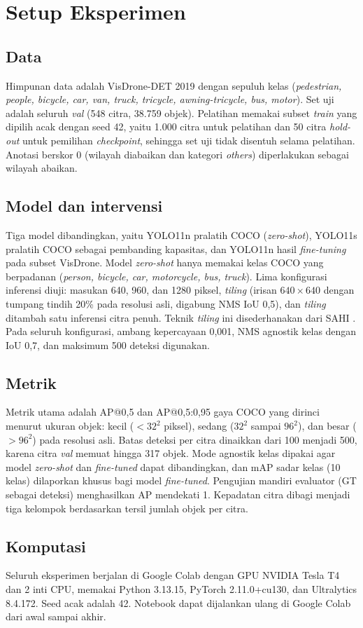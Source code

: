 \section{Setup Eksperimen}
\subsection{Data}
Himpunan data adalah VisDrone-DET 2019 \cite{du2019visdrone} dengan sepuluh kelas (\textit{pedestrian, people, bicycle, car, van, truck, tricycle, awning-tricycle, bus, motor}). Set uji adalah seluruh \textit{val} (548 citra, 38.759 objek). Pelatihan memakai subset \textit{train} yang dipilih acak dengan seed 42, yaitu 1.000 citra untuk pelatihan dan 50 citra \textit{hold-out} untuk pemilihan \textit{checkpoint}, sehingga set uji tidak disentuh selama pelatihan. Anotasi berskor 0 (wilayah diabaikan dan kategori \textit{others}) diperlakukan sebagai wilayah abaikan.

\subsection{Model dan intervensi}
Tiga model dibandingkan, yaitu YOLO11n pralatih COCO (\textit{zero-shot}), YOLO11s pralatih COCO sebagai pembanding kapasitas, dan YOLO11n hasil \textit{fine-tuning} pada subset VisDrone. Model \textit{zero-shot} hanya memakai kelas COCO yang berpadanan (\textit{person, bicycle, car, motorcycle, bus, truck}). Lima konfigurasi inferensi diuji: masukan 640, 960, dan 1280 piksel, \textit{tiling} (irisan $640\times640$ dengan tumpang tindih 20\% pada resolusi asli, digabung NMS IoU 0,5), dan \textit{tiling} ditambah satu inferensi citra penuh. Teknik \textit{tiling} ini disederhanakan dari SAHI \cite{akyon2022sahi}. Pada seluruh konfigurasi, ambang kepercayaan 0,001, NMS agnostik kelas dengan IoU 0,7, dan maksimum 500 deteksi digunakan.

\subsection{Metrik}
Metrik utama adalah AP@0,5 dan AP@0,5:0,95 gaya COCO \cite{lin2014coco} yang dirinci menurut ukuran objek: kecil ($<32^2$ piksel), sedang ($32^2$ sampai $96^2$), dan besar ($>96^2$) pada resolusi asli. Batas deteksi per citra dinaikkan dari 100 menjadi 500, karena citra \textit{val} memuat hingga 317 objek. Mode agnostik kelas dipakai agar model \textit{zero-shot} dan \textit{fine-tuned} dapat dibandingkan, dan mAP sadar kelas (10 kelas) dilaporkan khusus bagi model \textit{fine-tuned}. Pengujian mandiri evaluator (GT sebagai deteksi) menghasilkan AP mendekati 1. Kepadatan citra dibagi menjadi tiga kelompok berdasarkan tersil jumlah objek per citra.

\subsection{Komputasi}
Seluruh eksperimen berjalan di Google Colab dengan GPU NVIDIA Tesla T4 dan 2 inti CPU, memakai Python 3.13.15, PyTorch 2.11.0+cu130, dan Ultralytics 8.4.172. Seed acak adalah 42. Notebook dapat dijalankan ulang di Google Colab dari awal sampai akhir.
